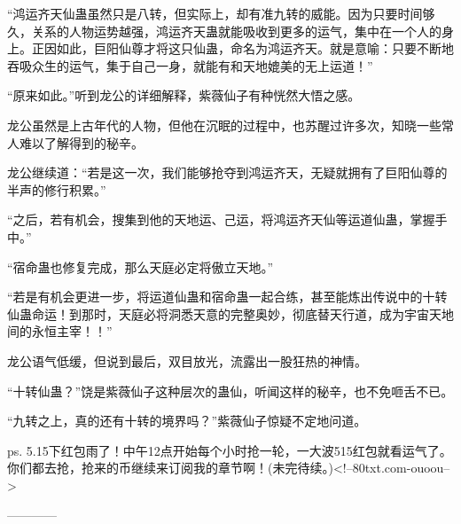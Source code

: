 \begin{this_body}
“鸿运齐天仙蛊虽然只是八转，但实际上，却有准九转的威能。因为只要时间够久，关系的人物运势越强，鸿运齐天蛊就能吸收到更多的运气，集中在一个人的身上。正因如此，巨阳仙尊才将这只仙蛊，命名为鸿运齐天。就是意喻：只要不断地吞吸众生的运气，集于自己一身，就能有和天地媲美的无上运道！”

“原来如此。”听到龙公的详细解释，紫薇仙子有种恍然大悟之感。

龙公虽然是上古年代的人物，但他在沉眠的过程中，也苏醒过许多次，知晓一些常人难以了解得到的秘辛。

龙公继续道：“若是这一次，我们能够抢夺到鸿运齐天，无疑就拥有了巨阳仙尊的半声的修行积累。”

“之后，若有机会，搜集到他的天地运、己运，将鸿运齐天仙等运道仙蛊，掌握手中。”

“宿命蛊也修复完成，那么天庭必定将傲立天地。”

“若是有机会更进一步，将运道仙蛊和宿命蛊一起合练，甚至能炼出传说中的十转仙蛊命运！到那时，天庭必将洞悉天意的完整奥妙，彻底替天行道，成为宇宙天地间的永恒主宰！！”

龙公语气低缓，但说到最后，双目放光，流露出一股狂热的神情。

“十转仙蛊？”饶是紫薇仙子这种层次的蛊仙，听闻这样的秘辛，也不免咂舌不已。

“九转之上，真的还有十转的境界吗？”紫薇仙子惊疑不定地问道。

ps. 5.15下红包雨了！中午12点开始每个小时抢一轮，一大波515红包就看运气了。你们都去抢，抢来的币继续来订阅我的章节啊！(未完待续。)<!--80txt.com-ouoou-->

------------

\end{this_body}

